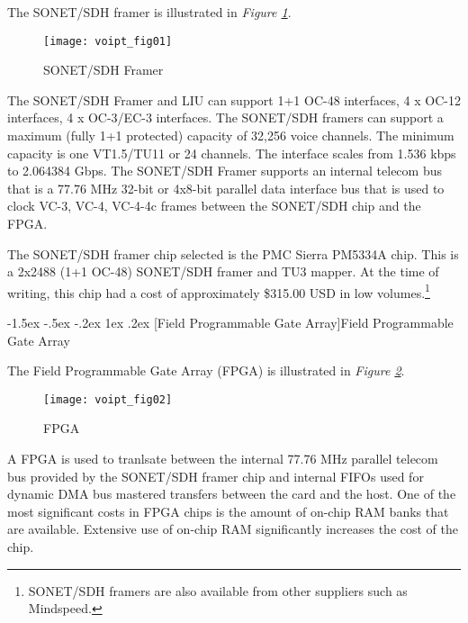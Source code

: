 \documentclass[letterpaper,final,notitlepage,twocolumn,10pt,twoside]{article}
\makeatletter
\renewcommand\subsection{\@startsection{subsection}{2}{\z@}%
                                     {-1.5ex \@plus -.5ex \@minus -.2ex}%
                                     {1ex \@plus .2ex}%
                                     {\normalfont\normalsize\bfseries}}
\makeatother
\begin{document}
The SONET/SDH framer is illustrated in \textsl{Figure \ref{figure:voipt_fig01}}.
\begin{figure}[htp]
\center\texttt{[image: voipt\_fig01]}
\caption[SONET/SDH Framer]{SONET/SDH Framer}
\label{figure:voipt_fig01}
\end{figure}
The SONET/SDH Framer and LIU can support 1+1 OC-48 interfaces, 4 x OC-12
interfaces, 4 x OC-3/EC-3 interfaces.  The SONET/SDH framers can support a
maximum (fully 1+1 protected) capacity of 32,256 voice channels.  The minimum
capacity is one VT1.5/TU11 or 24 channels.  The interface scales from 1.536 kbps
to 2.064384 Gbps.  The SONET/SDH Framer supports an internal telecom bus that is a
77.76 MHz 32-bit or 4x8-bit parallel data interface bus that is used to clock
VC-3, VC-4, VC-4-4c frames between the SONET/SDH chip and the FPGA.

The SONET/SDH framer chip selected is the PMC Sierra PM5334A chip.  This is a
2x2488 (1+1 OC-48) SONET/SDH framer and TU3 mapper.  At the time of writing,
this chip had a cost of approximately \$315.00 USD in low
volumes.\footnote{
SONET/SDH framers are also available from other suppliers such as Mindspeed.}

\subsection[Field Programmable Gate Array]{Field Programmable Gate Array}

The Field Programmable Gate Array (FPGA) is illustrated in \textsl{Figure
\ref{figure:voipt_fig02}}.
\begin{figure}[htp]
\center\texttt{[image: voipt\_fig02]}
\caption[FPGA]{FPGA}
\label{figure:voipt_fig02}
\end{figure}
A FPGA is used to tranlsate between the internal 77.76 MHz parallel telecom bus
provided by the SONET/SDH framer chip and internal FIFOs used for dynamic DMA
bus mastered transfers between the card and the host.  One of the most
significant costs in FPGA chips is the amount of on-chip RAM banks that are
available.  Extensive use of on-chip RAM significantly increases the cost of the
chip.
\end{document}
